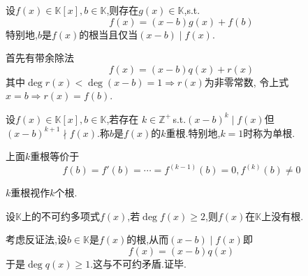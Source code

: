 \begin{formal}
\begin{theorem}[余数定理]\label{thm:余数定理}
    设$f\left(x\right)\in\mathbb{K}\left[x\right],b\in\mathbb{K}$,则存在$g\left(x\right)\in\mathbb{K}$,\textup{s.t.}
    \[
    f\left(x\right)=\left(x-b\right)g\left(x\right)+f\left(b\right)
    \]
    特别地,$b$是$f\left(x\right)$的根当且仅当$\left(x-b\right)\mid f\left(x\right)$.
\end{theorem}
\begin{Proof}
首先有带余除法
\[
f\left(x\right)=\left(x-b\right)q\left(x\right)+r\left(x\right)
\]
其中$\deg r\left(x\right)<\deg \left(x-b\right)=1\Longrightarrow r\left(x\right)$为非零常数,
令上式$x=b\Longrightarrow r\left(x\right)=f\left(b\right)$.
\end{Proof}
\end{formal}
\begin{formal}
\begin{definition}[重根]\label{def:重根}
    设$f\left(x\right)\in\mathbb{K}\left[x\right],b\in\mathbb{K}$,若存在
    $k\in\mathbb{Z}^+$\,\textup{s.t.}$\left(x-b\right)^k\mid f\left(x\right)$但$\left(x-b\right)^{k+1}\nmid f\left(x\right).$称$b$是$f\left(x\right)$的$k$重根.特别地,$k=1$时称为单根.  
\end{definition}
\end{formal}
\begin{formal}
\begin{definition}[等价定义]\label{def:等价定义}
    上面$k$重根等价于
    \[
    f\left(b\right)=f'\left(b\right)=\cdots=f^{\left(k-1\right)}\left(b\right)=0,f^{\left(k\right)}\left(b\right)\neq 0
    \]
\end{definition}
\end{formal}
\begin{red}
\begin{remark}
    $k$重根视作$k$个根.
\end{remark}
\end{red}
\begin{green}
\begin{lemma}[不可约多项式的根]\label{lem:不可约多项式的根}
    设$\mathbb{K}$上的不可约多项式$f\left(x\right)$,若$\deg f\left(x\right)\geqslant 2$,则$f\left(x\right)$在$\mathbb{K}$上没有根.
\end{lemma}
\begin{Proof}
考虑反证法,设$b\in\mathbb{K}$是$f\left(x\right)$的根,从而$\left(x-b\right)\mid f\left(x\right)$即
\[
f\left(x\right)=\left(x-b\right)q\left(x\right)
\]
于是$\deg q\left(x\right)\geqslant 1.$这与不可约矛盾.证毕.
\end{Proof}
\end{green}
